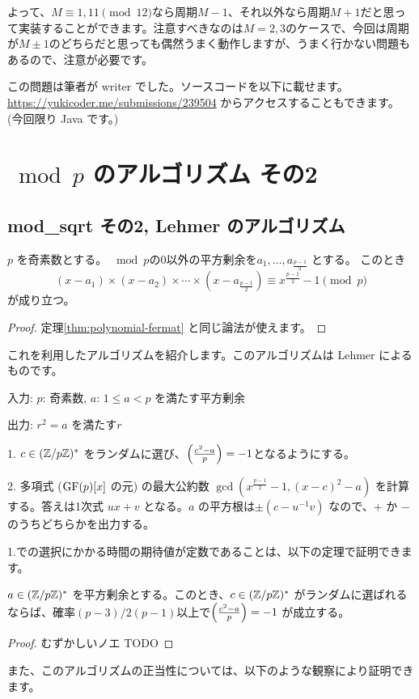 \documentclass{jsarticle}
\begin{document}
  よって、$M \equiv 1, 11 \pmod{12}$なら周期$M-1$、それ以外なら周期$M + 1$だと思って実装することができます。注意すべきなのは$M = 2,3$のケースで、今回は周期が$M \pm 1$のどちらだと思っても偶然うまく動作しますが、うまく行かない問題もあるので、注意が必要です。

  この問題は筆者が writer でした。ソースコードを以下に載せます。\url{https://yukicoder.me/submissions/239504} からアクセスすることもできます。 (今回限り Java です。)
  
 \section{${}\bmod p$ のアルゴリズム その2}
 \label{sec:mod-p-2}
  \subsection{mod\_sqrt その2, Lehmer のアルゴリズム}
  \label{subsec:karp-mod-sqrt}
  \begin{theorem}
   $p$ を奇素数とする。
   ${} \bmod p$の0以外の平方剰余を$a_1, \ldots, a_{\frac{p-1}{2}}$ とする。
   このとき
   \begin{displaymath}
    (x - a_1) \times (x - a_2) \times \cdots \times (x - a_{\frac{p-1}{2}})
    \equiv x^{\frac{p-1}{2}}-1 \pmod p
   \end{displaymath}
   が成り立つ。
  \end{theorem}
  \begin{proof}
   定理\ref{thm:polynomial-fermat} と同じ論法が使えます。
  \end{proof}
  これを利用したアルゴリズムを紹介します。このアルゴリズムは Lehmer によるものです。

  \begin{algorithm}
   \caption{\cite[Algorithm~3.1]{Karp1991}}
   \label{alg:lehmer-mod-sqrt}
   入力: $p$: 奇素数, $a$: $1 \le a < p$ を満たす平方剰余

   出力: $r^2 = a$ を満たす$r$

   1. $c \in (\mathbb{Z}/p\mathbb{Z})^*$ をランダムに選び、$\left(\frac{c^2-a}{p}\right) = -1$となるようにする。

   2. 多項式 ($\mathrm{GF}(p)[x]$ の元) の最大公約数 $\gcd(x^{\frac{p-1}{2}} - 1, (x-c)^2 - a)$ を計算する。答えは1次式 $ux + v$ となる。$a$ の平方根は$\pm (c - u^{-1}v)$ なので、$+$ か $-$ のうちどちらかを出力する。
  \end{algorithm}

  1.での選択にかかる時間の期待値が定数であることは、以下の定理で証明できます。
  \begin{theorem}
   \label{thm:abundance-of-witnesses-in-karp1991}
   $a \in (\mathbb{Z}/p\mathbb{Z})^*$ を平方剰余とする。このとき、$c \in (\mathbb{Z}/p\mathbb{Z})^*$ がランダムに選ばれるならば、確率$(p-3)/2(p-1)$以上で$\left(\frac{c^2-a}{p}\right) = -1$ が成立する。
  \end{theorem}
  \begin{proof}
   むずかしいノエ TODO
  \end{proof}
  また、このアルゴリズムの正当性については、以下のような観察により証明できます。
\end{document}
